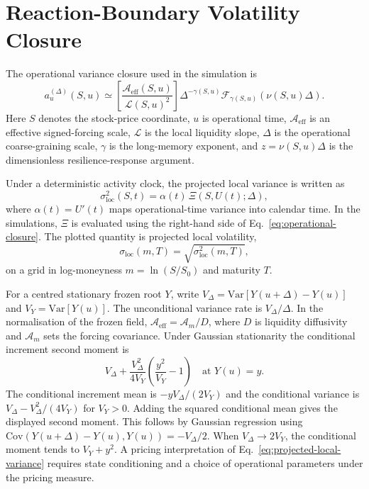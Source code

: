 \documentclass[11pt]{article}
\newcommand{\Aeff}{\mathcal A_{\mathrm{eff}}}
\newcommand{\Liq}{\mathcal L}
\newcommand{\Fresp}{\mathcal F}
\newcommand{\sigloc}{\sigma_{\mathrm{loc}}}
\begin{document}
\section{Reaction-Boundary Volatility Closure}

The operational variance closure used in the simulation is
\begin{equation}
 a_u^{(\Delta)}(S,u)
 \simeq
 \left[
 \frac{\Aeff(S,u)}
      {\Liq(S,u)^2}
 \right]
 \Delta^{-\gamma(S,u)}
 \Fresp_{\gamma(S,u)}\!\left(\nu(S,u)\Delta\right).
 \label{eq:operational-closure}
\end{equation}
Here \(S\) denotes the stock-price coordinate, \(u\) is operational time,
\(\Aeff\) is an effective signed-forcing scale, \(\Liq\) is the local
liquidity slope, \(\Delta\) is the operational coarse-graining scale,
\(\gamma\) is the long-memory exponent, and
\(z=\nu(S,u)\Delta\) is the dimensionless resilience-response argument.

Under a deterministic activity clock, the projected local variance is written
as
\begin{equation}
 \sigloc^2(S,t)
 =
 \alpha(t)\,
 \Xi(S,U(t);\Delta),
 \label{eq:projected-local-variance}
\end{equation}
where \(\alpha(t)=U'(t)\) maps operational-time variance into calendar time. In the
simulations, \(\Xi\) is evaluated using the right-hand side of
Eq.~\eqref{eq:operational-closure}. The plotted quantity is projected local
volatility,
\begin{equation}
 \sigloc(m,T)=\sqrt{\sigloc^2(m,T)},
 \label{eq:plotted-volatility}
\end{equation}
on a grid in log-moneyness \(m=\ln(S/S_0)\) and maturity \(T\).

For a centred stationary frozen root \(Y\), write
\(V_\Delta=\mathrm{Var}[Y(u+\Delta)-Y(u)]\) and \(V_Y=\mathrm{Var}[Y(u)]\).
The unconditional variance rate is \(V_\Delta/\Delta\). In the normalisation
of the frozen field, \(\Aeff=\mathcal A_m/D\), where \(D\) is liquidity
diffusivity and \(\mathcal A_m\) sets the forcing covariance. Under Gaussian
stationarity the conditional increment second moment is
\[
 V_\Delta+\frac{V_\Delta^2}{4V_Y}\left(\frac{y^2}{V_Y}-1\right)
 \quad\text{at }Y(u)=y .
\]
The conditional increment mean is \(-y V_\Delta/(2V_Y)\) and the
conditional variance is \(V_\Delta-V_\Delta^2/(4V_Y)\) for \(V_Y>0\).
Adding the squared conditional mean gives the displayed second moment.
This follows by Gaussian regression using
\(\mathrm{Cov}(Y(u+\Delta)-Y(u),Y(u))=-V_\Delta/2\).
When \(V_\Delta\to2V_Y\), the conditional moment tends to \(V_Y+y^2\).
A pricing interpretation of Eq.~\eqref{eq:projected-local-variance}
requires state conditioning and a choice of operational parameters under
the pricing measure.
\end{document}
